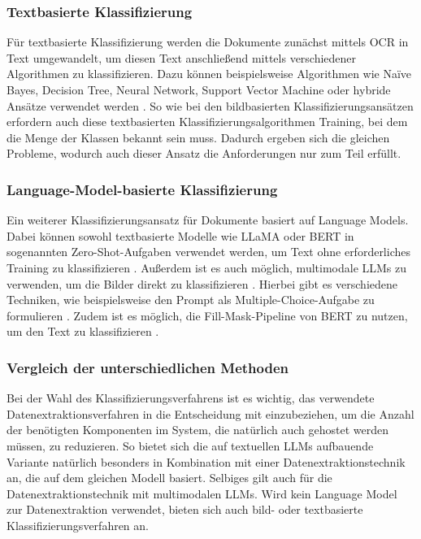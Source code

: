 \subsubsection{Textbasierte Klassifizierung}
\label{subsubsec:text-basierte-klassifizierung}

Für textbasierte Klassifizierung werden die Dokumente zunächst mittels \gls{OCR} in Text umgewandelt, um diesen Text anschließend mittels verschiedener Algorithmen zu klassifizieren. Dazu können beispielsweise Algorithmen wie Naïve Bayes, Decision Tree, Neural Network, Support Vector Machine oder hybride Ansätze verwendet werden \cite{dalal2011automatic, RasjidZulfanyErlisa2017PCaO, YangYiming1999Arot}. So wie bei den bildbasierten Klassifizierungsansätzen erfordern auch diese textbasierten Klassifizierungsalgorithmen Training, bei dem die Menge der Klassen bekannt sein muss. Dadurch ergeben sich die gleichen Probleme, wodurch auch dieser Ansatz die Anforderungen nur zum Teil erfüllt.

\subsubsection{Language-Model-basierte Klassifizierung}
\label{subsubsec:language-model-basierte-klassifizierung}

Ein weiterer Klassifizierungsansatz für Dokumente basiert auf Language Models. Dabei können sowohl textbasierte Modelle wie LLaMA oder BERT in sogenannten Zero-Shot-Aufgaben verwendet werden, um Text ohne erforderliches Training zu klassifizieren \cite{PuriRaul2019ZTCW, bert_as_classifier_without_fine_tuning}. Außerdem ist es auch möglich, multimodale LLMs zu verwenden, um die Bilder direkt zu klassifizieren \cite{LiJunnan2023BBLP, CaffagniDavide2024WHRG}. Hierbei gibt es verschiedene Techniken, wie beispielsweise den Prompt als Multiple-Choice-Aufgabe zu formulieren \cite{PuriRaul2019ZTCW}. Zudem ist es möglich, die Fill-Mask-Pipeline von BERT zu nutzen, um den Text zu klassifizieren \cite{bert_as_classifier_without_fine_tuning}.

\subsubsection{Vergleich der unterschiedlichen Methoden}
\label{subsubsec:vergleich-der-unterschiedlichen-methoden}

Bei der Wahl des Klassifizierungsverfahrens ist es wichtig, das verwendete Datenextraktionsverfahren in die Entscheidung mit einzubeziehen, um die Anzahl der benötigten Komponenten im System, die natürlich auch gehostet werden müssen, zu reduzieren. So bietet sich die auf textuellen \glspl{LLM} aufbauende Variante natürlich besonders in Kombination mit einer Datenextraktionstechnik an, die auf dem gleichen Modell basiert. Selbiges gilt auch für die Datenextraktionstechnik mit multimodalen \glspl{LLM}. Wird kein Language Model zur Datenextraktion verwendet, bieten sich auch bild- oder textbasierte Klassifizierungsverfahren an.

